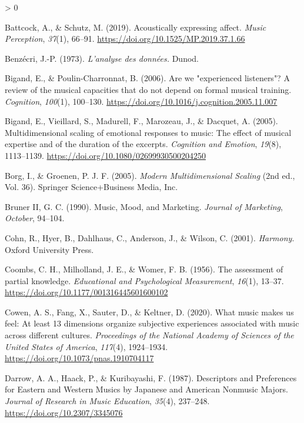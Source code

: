 \documentclass[
  english,
  man,floatsintext]{apa6}
\newlength{\cslhangindent}
\newenvironment{CSLReferences}[2] %
 {%
  \setlength{\parindent}{0pt}
  \ifodd #1 \everypar{\setlength{\hangindent}{\cslhangindent}}\ignorespaces\fi
  \ifnum #2 > 0
  \setlength{\parskip}{#2\baselineskip}
  \fi
 }%
 {}
\begin{document}
\begin{CSLReferences}{1}{0}
\leavevmode\hypertarget{ref-Battcock2019}{}%
Battcock, A., \& Schutz, M. (2019). {Acoustically expressing affect}. \emph{Music Perception}, \emph{37}(1), 66--91. \url{https://doi.org/10.1525/MP.2019.37.1.66}

\leavevmode\hypertarget{ref-Benzecri1973}{}%
Benzécri, J.-P. (1973). \emph{{L'analyse des données.}} Dunod.

\leavevmode\hypertarget{ref-Bigand2006}{}%
Bigand, E., \& Poulin-Charronnat, B. (2006). {Are we "experienced listeners"? A review of the musical capacities that do not depend on formal musical training}. \emph{Cognition}, \emph{100}(1), 100--130. \url{https://doi.org/10.1016/j.cognition.2005.11.007}

\leavevmode\hypertarget{ref-Bigand2005}{}%
Bigand, E., Vieillard, S., Madurell, F., Marozeau, J., \& Dacquet, A. (2005). {Multidimensional scaling of emotional responses to music: The effect of musical expertise and of the duration of the excerpts}. \emph{Cognition and Emotion}, \emph{19}(8), 1113--1139. \url{https://doi.org/10.1080/02699930500204250}

\leavevmode\hypertarget{ref-Borg2005}{}%
Borg, I., \& Groenen, P. J. F. (2005). \emph{{Modern Multidimensional Scaling}} (2nd ed., Vol. 36). Springer Science+Business Media, Inc.

\leavevmode\hypertarget{ref-BrunerII1990}{}%
Bruner II, G. C. (1990). {Music, Mood, and Marketing}. \emph{Journal of Marketing}, \emph{October}, 94--104.

\leavevmode\hypertarget{ref-Cohn2001}{}%
Cohn, R., Hyer, B., Dahlhaus, C., Anderson, J., \& Wilson, C. (2001). \emph{{Harmony}}. Oxford University Press.

\leavevmode\hypertarget{ref-Coombs1956}{}%
Coombs, C. H., Milholland, J. E., \& Womer, F. B. (1956). {The assessment of partial knowledge}. \emph{Educational and Psychological Measurement}, \emph{16}(1), 13--37. \url{https://doi.org/10.1177/001316445601600102}

\leavevmode\hypertarget{ref-Cowen2020}{}%
Cowen, A. S., Fang, X., Sauter, D., \& Keltner, D. (2020). {What music makes us feel: At least 13 dimensions organize subjective experiences associated with music across different cultures}. \emph{Proceedings of the National Academy of Sciences of the United States of America}, \emph{117}(4), 1924--1934. \url{https://doi.org/10.1073/pnas.1910704117}

\leavevmode\hypertarget{ref-Darrow1987}{}%
Darrow, A. A., Haack, P., \& Kuribayashi, F. (1987). {Descriptors and Preferences for Eastern and Western Musics by Japanese and American Nonmusic Majors}. \emph{Journal of Research in Music Education}, \emph{35}(4), 237--248. \url{https://doi.org/10.2307/3345076}


\end{CSLReferences}
\end{document}
